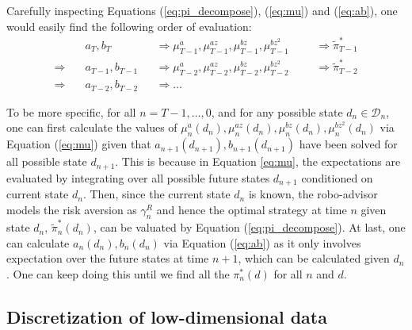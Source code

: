 Carefully inspecting Equations (\ref{eq:pi_decompose}), (\ref{eq:mu}) and (\ref{eq:ab}), one would easily find the following order of evaluation:\begin{equation}\label{eq:order}\begin{aligned}
    &a_T,b_T&&\Rightarrow \mu_{T-1}^{a}, \mu_{T-1}^{az}, \mu_{T-1}^{bz}, \mu_{T-1}^{bz^2}&&&\Rightarrow\tilde\pi_{T-1}^*\\
    \Rightarrow\quad&a_{T-1},b_{T-1}&&\Rightarrow\mu_{T-2}^{a}, \mu_{T-2}^{az}, \mu_{T-2}^{bz}, \mu_{T-2}^{bz^2}&&&\Rightarrow\tilde\pi_{T-2}^*\\
    \Rightarrow\quad&a_{T-2},b_{T-2}&&\Rightarrow\ldots
\end{aligned}
\end{equation}

To be more specific, for all $n=T-1,\ldots,0$, and for any possible state $d_n\in\mathcal D_n$, one can first calculate the values of $\mu_{n}^{a}(d_n), \mu_{n}^{az}(d_n), \mu_{n}^{bz}(d_n), \mu_{n}^{bz^2}(d_n)$ via Equation (\ref{eq:mu}) given that $a_{n+1}(d_{n+1}),b_{n+1}(d_{n+1})$ have been solved for all possible state $d_{n+1}$. This is because in Equation \eqref{eq:mu}, the expectations are evaluated by integrating over all possible future states $d_{n+1}$ conditioned on current state $d_n$. Then, since the current state $d_n$ is known, the robo-advisor models the risk aversion as $\gamma_n^R$ and hence the optimal strategy at time $n$ given state $d_n$, $\tilde\pi_n^*(d_n)$, can be valuated by Equation (\ref{eq:pi_decompose}). At last, one can calculate $a_n(d_n),b_n(d_n)$ via Equation (\ref{eq:ab}) as it only involves expectation over the future states at time $n+1$, which can be calculated given $d_n$. One can keep doing this until we find all the $\pi_n^*(d) $ for all $n$ and $d$.

\subsection{Discretization of low-dimensional data}

